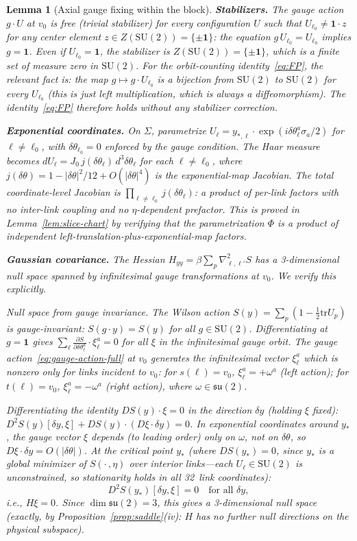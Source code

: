 \documentclass[11pt]{article}
\newtheorem{lemma}[theorem]{Lemma}
\theoremstyle{definition}
\newcommand{\SU}{\mathrm{SU}}
\newcommand{\su}{\mathfrak{su}}
\newcommand{\tr}{\mathrm{tr}}
\begin{document}
\begin{lemma}[Axial gauge fixing within the block]
\textbf{Stabilizers.}
The gauge action $g\cdot U$ at $v_0$ is \emph{free}
(trivial stabilizer) for every configuration $U$ such that
$U_{\ell_0}\ne\mathbf{1}\cdot z$ for any center element
$z\in Z(\SU(2))=\{\pm\mathbf{1}\}$: the equation
$g\,U_{\ell_0}=U_{\ell_0}$ implies $g=\mathbf{1}$.
Even if $U_{\ell_0}=\mathbf{1}$, the stabilizer is
$Z(\SU(2))=\{\pm\mathbf{1}\}$, which is a finite set of
measure zero in $\SU(2)$.  For the orbit-counting
identity~\eqref{eq:FP}, the relevant fact is: the map
$g\mapsto g\cdot U_{\ell_0}$ is a bijection from $\SU(2)$
to $\SU(2)$ for \emph{every} $U_{\ell_0}$
(this is just left multiplication, which is always a
diffeomorphism).  The identity~\eqref{eq:FP} therefore
holds without any stabilizer correction.

\textbf{Exponential coordinates.}
On $\Sigma$, parametrize $U_\ell=y_{*,\ell}\cdot
\exp(i\delta\theta_\ell^a\sigma_a/2)$ for $\ell\ne\ell_0$, with
$\delta\theta_{\ell_0}=0$ enforced by the gauge condition.  The Haar
measure becomes $dU_\ell=J_0\,j(\delta\theta_\ell)\,d^3\delta\theta_\ell$
for each $\ell\ne\ell_0$, where $j(\delta\theta)
=1-|\delta\theta|^2/12+O(|\delta\theta|^4)$ is the exponential-map
Jacobian.  The total coordinate-level Jacobian is
$\prod_{\ell\ne\ell_0}j(\delta\theta_\ell)$: a product of
per-link factors with no inter-link coupling and no
$\eta$-dependent prefactor.  This is proved in
Lemma~\ref{lem:slice-chart} by verifying that the
parametrization $\Phi$ is a product of independent
left-translation-plus-exponential-map factors.

\textbf{Gaussian covariance.}
The Hessian $H_{yy}=\beta\sum_p\nabla_{\ell,\ell'}^2 S$ has a
3-dimensional null space spanned by infinitesimal gauge
transformations at $v_0$.  We verify this explicitly.

\emph{Null space from gauge invariance.}
The Wilson action $S(y)=\sum_p(1-\frac{1}{2}\tr U_p)$ is
gauge-invariant: $S(g\cdot y)=S(y)$ for all $g\in\SU(2)$.
Differentiating at $g=\mathbf{1}$ gives
$\sum_\ell\frac{\partial S}{\partial\delta\theta_\ell^a}
\cdot\xi_\ell^a=0$ for all $\xi$ in the infinitesimal gauge
orbit.  The gauge action~\eqref{eq:gauge-action-full} at $v_0$
generates the infinitesimal vector $\xi_\ell^a$ which is nonzero
only for links incident to $v_0$: for $s(\ell)=v_0$,
$\xi_\ell^a=+\omega^a$ (left action); for $t(\ell)=v_0$,
$\xi_\ell^a=-\omega^a$ (right action), where $\omega\in\su(2)$.

Differentiating the identity
$DS(y)\cdot\xi=0$ in the direction $\delta y$
(holding $\xi$ fixed):
$D^2 S(y)[\delta y,\xi]+DS(y)\cdot(D\xi\cdot\delta y)=0$.
In exponential coordinates around $y_*$, the gauge vector $\xi$
depends (to leading order) only on $\omega$, not on $\delta\theta$,
so $D\xi\cdot\delta y=O(|\delta\theta|)$.
At the critical point $y_*$ (where $DS(y_*)=0$, since $y_*$ is a
global minimizer of $S(\cdot\,,\eta)$ over interior links---each
$U_\ell\in\SU(2)$ is unconstrained, so stationarity holds in all
32~link coordinates):
\[
D^2 S(y_*)[\delta y,\xi]=0\quad\text{for all }\delta y,
\]
i.e., $H\xi=0$.  Since $\dim\su(2)=3$,
this gives a 3-dimensional null space (exactly, by
Proposition~\ref{prop:saddle}(iv): $H$ has no further null
directions on the physical subspace).


\end{lemma}
\end{document}
